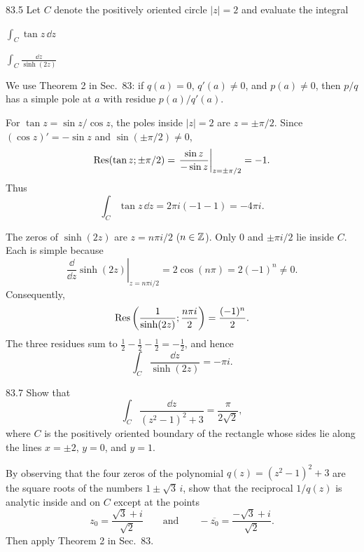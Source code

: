\documentclass[11pt,oneside]{article}
\begin{document}
\begin{exercise}{83.5}
Let $C$ denote the positively oriented circle $|z|=2$ and evaluate the integral
\begin{exercisesubparts}
    \item $\displaystyle\int_C\tan z\,\dd z$
    \item $\displaystyle\int_C\frac{\dd z}{\sinh(2z)}$
\end{exercisesubparts}
\end{exercise}

\begin{solution}
We use Theorem 2 in Sec.~83: if $q(a)=0$, $q'(a)\ne0$, and $p(a)\ne0$, then $p/q$ has a simple pole at $a$ with residue $p(a)/q'(a)$.
\begin{exercisesubparts}
    \item For $\tan z=\sin z/\cos z$, the poles inside $|z|=2$ are $z=\pm\pi/2$. Since $(\cos z)'=-\sin z$ and $\sin(\pm\pi/2)\ne0$,
    \[
        \operatorname{Res}(\tan z; \pm\pi/2)
        =\left.\frac{\sin z}{-\sin z}\right|_{z=\pm\pi/2}=-1.
    \]
    Thus
    \[
        \boxed{\int_C\tan z\,\dd z=2\pi i(-1-1)=-4\pi i.}
    \]

    \item The zeros of $\sinh(2z)$ are $z=n\pi i/2$ ($n\in\mathbb{Z}$). Only $0$ and $\pm\pi i/2$ lie inside $C$. Each is simple because
    \[
        \left.\frac{\dd}{\dd z}\sinh(2z)\right|_{z=n\pi i/2}
        =2\cos(n\pi)=2(-1)^n\ne0.
    \]
    Consequently,
    \[
        \operatorname{Res}\left(\frac1{\sinh(2z)}; \frac{n\pi i}{2}\right)
        =\frac{(-1)^n}{2}.
    \]
    The three residues sum to $\frac12-\frac12-\frac12=-\frac12$, and hence
    \[
        \boxed{\int_C\frac{\dd z}{\sinh(2z)}=-\pi i.}
    \]
\end{exercisesubparts}
\end{solution}

\begin{exercise}{83.7}
Show that
\[
    \int_C\frac{\dd z}{(z^2-1)^2+3}=\frac{\pi}{2\sqrt2},
\]
where $C$ is the positively oriented boundary of the rectangle whose sides lie along the lines $x=\pm2$, $y=0$, and $y=1$.
\begin{suggestion}
By observing that the four zeros of the polynomial $q(z)=(z^2-1)^2+3$ are the square roots of the numbers $1\pm\sqrt3\,i$, show that the reciprocal $1/q(z)$ is analytic inside and on $C$ except at the points
\[
    z_0=\frac{\sqrt3+i}{\sqrt2}
    \qquad\text{and}\qquad
    -\overline{z_0}=\frac{-\sqrt3+i}{\sqrt2}.
\]
Then apply Theorem 2 in Sec.~83.
\end{suggestion}
\end{exercise}
\end{document}
